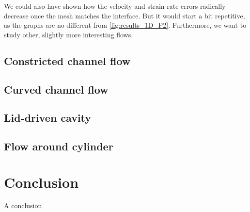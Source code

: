 \documentclass[11 pt]{report}
\begin{document}
We could also have shown how the velocity and strain rate errors radically decrease once the mesh matches the interface. But it would start a bit repetitive, as the graphs are no different from \cref{fig:results_1D_P2}. Furthermore, we want to study other, slightly more interesting flows.

\section{Constricted channel flow}

\section{Curved channel flow}

\section{Lid-driven cavity}

\section{Flow around cylinder}

\chapter*{Conclusion}
A conclusion


%         
%         
\end{document}
